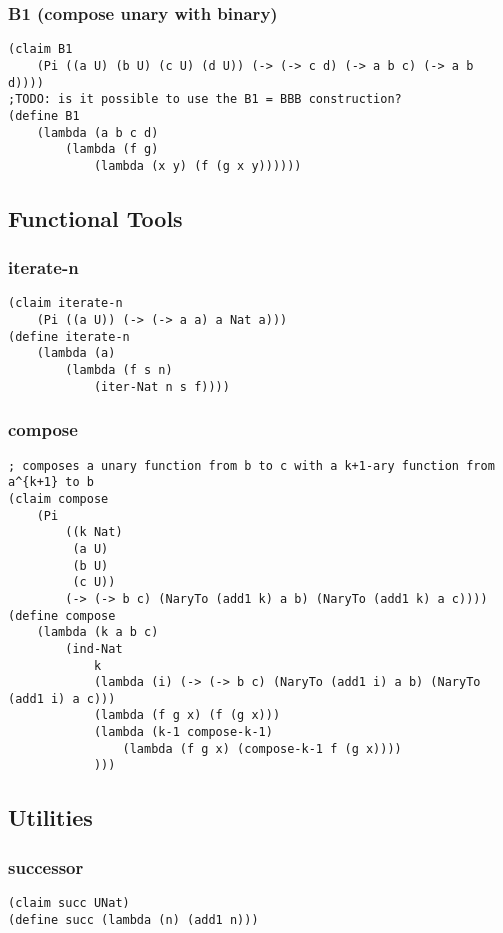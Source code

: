 \subsubsection{B1 (compose unary with binary)} \label{code:B1}
\begin{verbatim}
(claim B1
    (Pi ((a U) (b U) (c U) (d U)) (-> (-> c d) (-> a b c) (-> a b d))))
;TODO: is it possible to use the B1 = BBB construction?
(define B1
    (lambda (a b c d)
        (lambda (f g)
            (lambda (x y) (f (g x y))))))
\end{verbatim}


\subsection{Functional Tools}

\subsubsection{iterate-n} \label{code:iterate-n}
\begin{verbatim}
(claim iterate-n
    (Pi ((a U)) (-> (-> a a) a Nat a)))
(define iterate-n
    (lambda (a)
        (lambda (f s n)
            (iter-Nat n s f))))
\end{verbatim}

\subsubsection{compose} \label{code:compose}
\begin{verbatim}
; composes a unary function from b to c with a k+1-ary function from a^{k+1} to b
(claim compose
    (Pi 
        ((k Nat)
         (a U)
         (b U)
         (c U))
        (-> (-> b c) (NaryTo (add1 k) a b) (NaryTo (add1 k) a c))))
(define compose
    (lambda (k a b c)
        (ind-Nat
            k
            (lambda (i) (-> (-> b c) (NaryTo (add1 i) a b) (NaryTo (add1 i) a c)))
            (lambda (f g x) (f (g x)))
            (lambda (k-1 compose-k-1)
                (lambda (f g x) (compose-k-1 f (g x))))
            )))
\end{verbatim}


\subsection{Utilities}

\subsubsection{successor} \label{code:successor}
\begin{verbatim}
(claim succ UNat)
(define succ (lambda (n) (add1 n)))
\end{verbatim}

